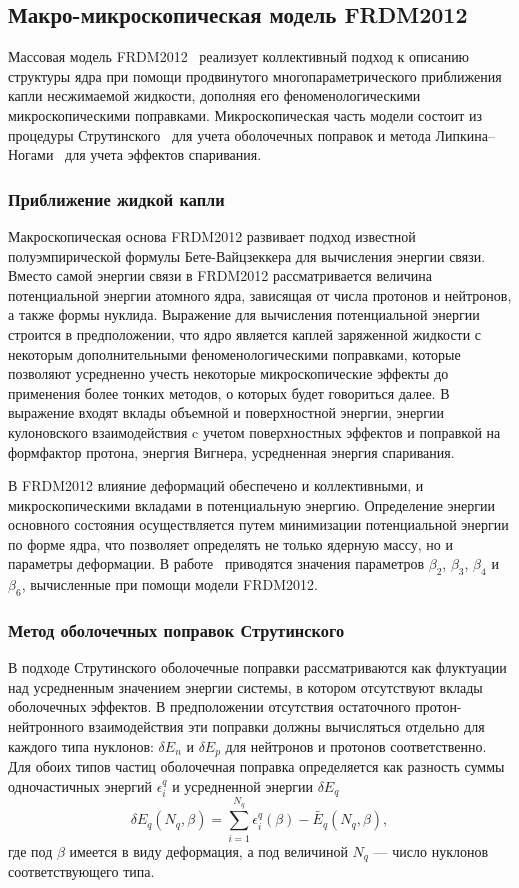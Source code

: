 \subsection{Макро-микроскопическая модель FRDM2012}
Массовая модель FRDM2012~\cite{moller2016} реализует коллективный подход к описанию структуры ядра при помощи продвинутого многопараметрического приближения капли несжимаемой жидкости, дополняя его феноменологическими микроскопическими поправками. Микроскопическая часть модели состоит из процедуры Струтинского~\cite{strutinsky1966, strutinsky1967} для учета оболочечных поправок и метода Липкина--Ногами~\cite{lipkin1960, nogami1964} для учета эффектов спаривания.

\subsubsection{Приближение жидкой капли}
Макроскопическая основа FRDM2012 развивает подход известной полуэмпирической формулы Бете-Вайцзеккера для вычисления энергии связи. Вместо самой энергии связи в FRDM2012 рассматривается величина потенциальной энергии атомного ядра, зависящая от числа протонов и нейтронов, а также формы нуклида. Выражение для вычисления потенциальной энергии строится в предположении, что ядро является каплей заряженной жидкости с некоторым дополнительными феноменологическими поправками, которые позволяют усредненно учесть некоторые микроскопические эффекты до применения более тонких методов, о которых будет говориться далее. В выражение входят вклады объемной и поверхностной энергии, энергии кулоновского взаимодействия c учетом поверхностных эффектов и поправкой на формфактор протона, энергия Вигнера, усредненная энергия спаривания. 

В FRDM2012 влияние деформаций обеспечено и коллективными, и микроскопическими вкладами в потенциальную энергию. Определение энергии основного состояния осуществляется путем минимизации потенциальной энергии по форме ядра, что позволяет определять не только ядерную массу, но и параметры деформации. В работе~\cite{moller2016} приводятся значения параметров $\beta_2$, $\beta_3$, $\beta_4$ и $\beta_6$, вычисленные при помощи модели FRDM2012.

\subsubsection{Метод оболочечных поправок Струтинского}
В подходе Струтинского оболочечные поправки рассматриваются как флуктуации над усредненным значением энергии системы, в котором отсутствуют вклады оболочечных эффектов. В предположении отсутствия остаточного протон-нейтронного взаимодействия эти поправки должны вычисляться отдельно для каждого типа нуклонов: $\delta E_n$ и $\delta E_p$ для нейтронов и протонов соответственно. Для обоих типов частиц оболочечная поправка определяется как разность суммы одночастичных энергий $\epsilon^q_i$ и усредненной энергии $\delta{E_q}$
\begin{equation}
\delta E_q(N_q, \beta) = \sum^{N_q}_{i = 1} \epsilon^q_i(\beta) - \tilde{E_q}(N_q, \beta),
\end{equation}
где под $\beta$ имеется в виду деформация, а под величиной $N_q$ --- число нуклонов соответствующего типа. 

